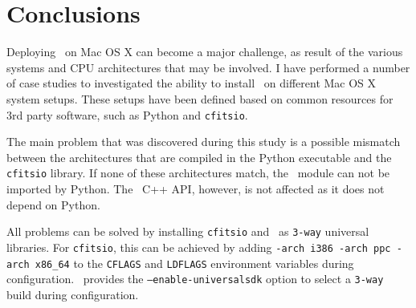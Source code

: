 \documentclass{article}[12pt,a4]
\begin{document}
\section{Conclusions}

Deploying \this\ on Mac OS X can become a major challenge, as result of the various systems
and CPU architectures that may be involved.
I have performed a number of case studies to investigated the ability to install \this\ on different 
Mac OS X system setups.
These setups have been defined based on common resources for 3rd party software, such as
Python and {\tt cfitsio}.

The main problem that was discovered during this study is a possible mismatch between the
architectures that are compiled in the Python executable and the {\tt cfitsio} library.
If none of these architectures match, the \this\ module can not be imported by Python.
The \this\ C++ API, however, is not affected as it does not depend on Python.

All problems can be solved by installing {\tt cfitsio} and \this\ as {\tt 3-way} universal
libraries.
For {\tt cfitsio}, this can be achieved by adding {\tt -arch i386 -arch ppc -arch x86\_64}
to the {\tt CFLAGS} and {\tt LDFLAGS} environment variables during configuration.
\this\ provides the {\tt --enable-universalsdk} option to select a {\tt 3-way} build
during configuration.
\end{document}

